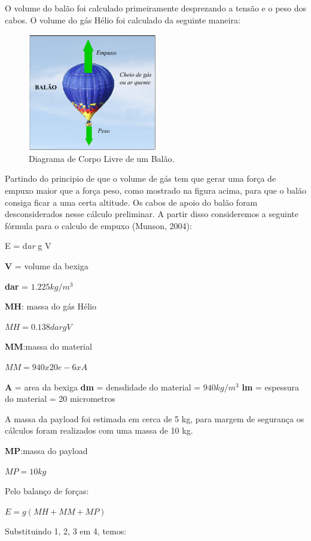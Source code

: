 	O volume do balão foi calculado primeiramente desprezando a tensão e o peso dos cabos. 	O volume do gás Hélio foi calculado da seguinte maneira:

	\begin{figure}[H]
		\centering
		\includegraphics[width=0.5\textwidth]{figuras/corpoLivreBalao}
		\caption{Diagrama de Corpo Livre de um Balão.}
		\label{img:corpoLivreBalao}
	\end{figure}

	Partindo do principio de que o volume de gás tem que gerar uma força de empuxo maior que a força peso, como mostrado na figura acima, para que o balão consiga ficar a uma certa altitude. Os cabos de apoio do balão foram desconsiderados nesse cálculo preliminar. A partir disso consideremos a seguinte fórmula para o calculo de empuxo (Munson, 2004):

	E = d\textit{ar} g V


	\textbf{V} = volume da bexiga
	
	\textbf{dar} = $1.225 kg/m^3$
	
	\textbf{MH}: massa do gás Hélio 

	$MH = 0.138dar g V$

	\textbf{MM}:massa do material 

 			$MM = 940 x 20e-6 x A$		

	\textbf{A} = area da bexiga
	\textbf{dm} = densdidade do material = $940 kg/m^3$
	\textbf{lm} = espessura do material = 20 micrometros

	A massa da payload foi estimada em cerca de 5 kg, para margem de segurança os cálculos foram realizados com uma massa de 10 kg. 

	\textbf{MP}:massa do payload 
	
	$MP =  10kg$

	Pelo balanço de forças:

	$E = g(MH+MM+MP)$

	Substituindo 1, 2, 3 em 4, temos:

